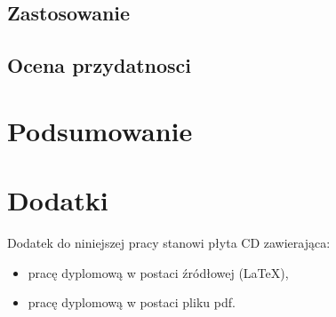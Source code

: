 \documentclass[11pt, a4paper,polish,twoside]{report}
\begin{document}
\section{Zastosowanie}
\section{Ocena przydatnosci}

\chapter{Podsumowanie}
%




\nocite{*}
\printbibliography 


\chapter*{Dodatki}
Dodatek do niniejszej pracy stanowi płyta CD zawierająca:
\begin{itemize}
\item pracę dyplomową w postaci źródłowej (LaTeX),
\item pracę dyplomową w postaci pliku pdf.
\end{itemize}

\newpage
{}	
\listoffigures

\newpage
{}	
\listoftables

\end{document}
